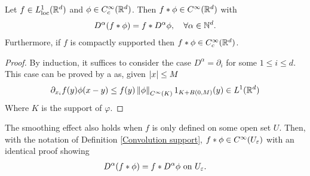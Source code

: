 \documentclass[
    a4paper,
    DIV=14,
    abstract=true,
    numbers=noenddot
]{scrartcl}
\begin{document}
\begin{proposition}\label{smooth}
	Let $f \in L^1_{\text{loc}}(\mathbb{R}^d)$ and $\phi \in C_c^\infty(\mathbb{R}^d)$. Then $f*\phi \in C^\infty(\mathbb{R}^d)$ with
	\begin{align*}
		D^\alpha(f *\phi)=f*D^\alpha \phi , \quad\forall \alpha \in \mathbb{N}^d.
	\end{align*}
	Furthermore, if $f$ is compactly supported then  $f*\phi \in  C_c^\infty(\mathbb{R}^d)$.
\end{proposition}
\begin{proof}
	By induction, it suffices to consider the case $D^\alpha = \partial _i$ for some $1 \leq i \leq d$. This case can be proved by a  as, given ${\left| x \right|}\leq M$
	\begin{align*}
		\partial _{x_i} f(y)\phi(x-y) \leq f(y)\left\lVert \phi \right\rVert_{C^\infty(K)} 1_{K+B(0,M)}(y) \in L^1(\mathbb{R}^d)
	\end{align*}
	Where $K$ is the support of  $\varphi$.
\end{proof}
\begin{observation}\label{local smoothing}
	The smoothing effect also holds when $f$ is only defined on some open set $U$. Then, with the notation of Definition \ref{Convolution support}, $f*\phi \in C^\infty(U_\varepsilon )    $ with an identical proof showing
	\begin{align*}
		D^\alpha(f *\phi)=f*D^\alpha \phi \text{ on } U_\varepsilon .
	\end{align*}
\end{observation}
\end{document}
